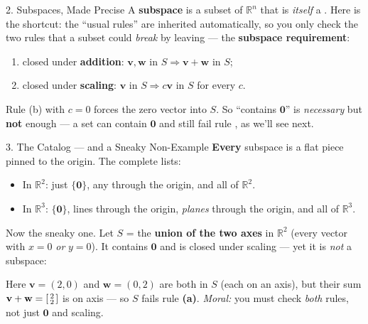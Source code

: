 \documentclass[10pt]{article}
\newcommand{\vv}{\mathbf{v}}
\newcommand{\ww}{\mathbf{w}}
\newcommand{\zero}{\mathbf{0}}
\begin{document}
\begin{notesbox}{2. Subspaces, Made Precise}
A \textbf{subspace} is a subset of $\mathbb{R}^n$ that is \emph{itself} a \blank{2.6cm}. Here is the
shortcut: the ``usual rules'' are inherited automatically, so you only check the two rules that a
subset could \emph{break} by leaving --- the \textbf{subspace requirement}:
\begin{enumerate}[leftmargin=1.9em, itemsep=3pt]
  \item[\textbf{(a)}] closed under \textbf{addition}: $\vv,\ww$ in $S \Rightarrow \vv+\ww$ in $S$;
  \item[\textbf{(b)}] closed under \textbf{scaling}: $\vv$ in $S \Rightarrow c\vv$ in $S$ for every $c$.
\end{enumerate}
Rule (b) with $c=0$ forces the zero vector into $S$. So ``contains $\zero$'' is \emph{necessary} but
\textbf{not} enough --- a set can contain $\zero$ and still fail rule \blank{1.0cm}, as we'll see next.
\end{notesbox}

\begin{notesbox}{3. The Catalog --- and a Sneaky Non-Example}
\textbf{Every} subspace is a flat piece pinned to the origin. The complete lists:
\begin{itemize}[leftmargin=1.5em, itemsep=1pt]
  \item In $\mathbb{R}^2$: just $\{\zero\}$, any \blank{2.8cm} through the origin, and all of $\mathbb{R}^2$.
  \item In $\mathbb{R}^3$: $\{\zero\}$, lines through the origin, \emph{planes} through the origin, and all of $\mathbb{R}^3$.
\end{itemize}
Now the sneaky one. Let $S$ = the \textbf{union of the two axes} in $\mathbb{R}^2$ (every vector with
$x=0$ \emph{or} $y=0$). It contains $\zero$ and is closed under scaling --- yet it is \emph{not} a
subspace:
\begin{center}
\end{center}
Here $\vv=(2,0)$ and $\ww=(0,2)$ are both in $S$ (each on an axis), but their sum
$\vv+\ww=\begin{bsmallmatrix} 2\\2 \end{bsmallmatrix}$ is on \blank{2.2cm} axis --- so $S$ fails rule
\textbf{(a)}. \emph{Moral:} you must check \emph{both} rules, not just $\zero$ and scaling.
\end{notesbox}
\end{document}
